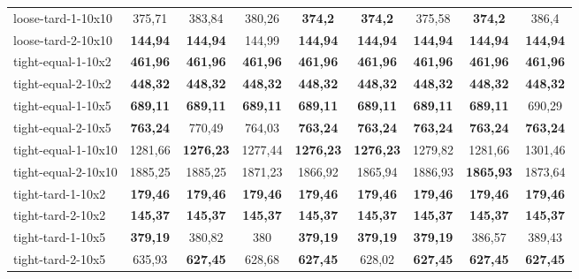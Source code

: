 \begin{table}
{\begin{tabular}{lcccccccc}
loose-tard-1-10x10  & 375,71          & 383,84          & 380,26          & \textbf{374,2}  & \textbf{374,2}  & 375,58             & \textbf{374,2}        & 386,4                  \\
loose-tard-2-10x10  & \textbf{144,94} & \textbf{144,94} & 144,99          & \textbf{144,94} & \textbf{144,94} & \textbf{144,94}    & \textbf{144,94}       & \textbf{144,94}         \\
tight-equal-1-10x2  & \textbf{461,96} & \textbf{461,96} & \textbf{461,96} & \textbf{461,96} & \textbf{461,96} & \textbf{461,96}    & \textbf{461,96}       & \textbf{461,96}         \\
tight-equal-2-10x2  & \textbf{448,32} & \textbf{448,32} & \textbf{448,32} & \textbf{448,32} & \textbf{448,32} & \textbf{448,32}    & \textbf{448,32}       & \textbf{448,32}         \\
tight-equal-1-10x5  & \textbf{689,11} & \textbf{689,11} & \textbf{689,11} & \textbf{689,11} & \textbf{689,11} & \textbf{689,11}    & \textbf{689,11}       & 690,29                  \\
tight-equal-2-10x5  & \textbf{763,24} & 770,49          & 764,03          & \textbf{763,24} & \textbf{763,24} & \textbf{763,24}    & \textbf{763,24}       & \textbf{763,24}         \\
tight-equal-1-10x10 & 1281,66         & \textbf{1276,23} & 1277,44         & \textbf{1276,23} & \textbf{1276,23} & 1279,82         & 1281,66      & 1301,46                 \\
tight-equal-2-10x10 & 1885,25         & 1885,25         & 1871,23         & 1866,92         & 1865,94 & 1886,93                    & \textbf{1865,93}      & 1873,64                 \\
tight-tard-1-10x2   & \textbf{179,46} & \textbf{179,46} & \textbf{179,46} & \textbf{179,46} & \textbf{179,46} & \textbf{179,46}    & \textbf{179,46}       & \textbf{179,46}         \\
tight-tard-2-10x2   & \textbf{145,37} & \textbf{145,37} & \textbf{145,37} & \textbf{145,37} & \textbf{145,37} & \textbf{145,37}    & \textbf{145,37}       & \textbf{145,37}         \\
tight-tard-1-10x5   & \textbf{379,19} & 380,82          & 380             & \textbf{379,19} & \textbf{379,19} & \textbf{379,19}    & 386,57                & 389,43                  \\
tight-tard-2-10x5   & 635,93          & \textbf{627,45} & 628,68          & \textbf{627,45} & 628,02          & \textbf{627,45}    & \textbf{627,45}       & \textbf{627,45}         \\

\end{tabular}}
\end{table}

